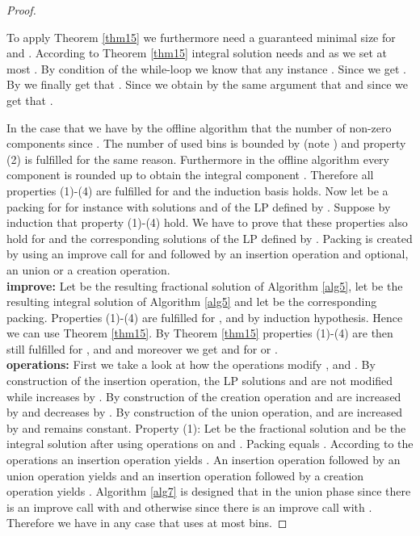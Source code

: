 \documentclass[a4paper,11pt]{article}
\begin{document}
\begin{proof}
\begin{enumerate}
	\end{enumerate}
	To apply Theorem \ref{thm15} we furthermore need a guaranteed minimal size for  and .
	According to Theorem \ref{thm15} integral solution  needs  and 
	 as we set at most .
	By condition of the while-loop we know that any instance . 
	Since  we get
	. 
	By  we
	finally get that . Since  we obtain by the same argument
	that  and since  we get that .
	
	In the case that  we have by the offline algorithm that the number of non-zero components  since . The number of used bins is bounded
	by 
	(note ) and property (2) is fulfilled for the same reason. Furthermore in the 
	offline algorithm every component  is rounded up to obtain the integral component . 
	Therefore all properties (1)-(4) are fulfilled for  and the induction basis holds.
	Now let  be a packing for  for instance  with solutions  and  of the LP defined by 
	. Suppose
	by induction that property (1)-(4) hold. We have to prove that these properties also hold for  and the
	corresponding solutions of the LP defined by . Packing  is created by using an
	improve call for  and  followed by an insertion operation and optional, an union or a creation operation.
	\\{\bf improve:} Let  be the resulting fractional solution of Algorithm \ref{alg5}, let  be the resulting integral solution
	of Algorithm \ref{alg5} and let  be the corresponding packing. Properties (1)-(4) are fulfilled 
	for ,  and  by induction hypothesis. Hence we can use Theorem \ref{thm15}. 
	By Theorem \ref{thm15} properties (1)-(4) are then still fulfilled for ,  and  and moreover we get
	 and 
	 for  or .
	\\{\bf operations:} First we take a look at how the operations modify ,  and .
	By construction of the insertion operation, the LP solutions  and  are not modified while 
	increases by . By construction of the creation operation  and  are increased by 
	and  decreases by . By construction of the union operation,  and  
	are increased by  and  remains constant.
	Property (1): Let  be the fractional solution and  be the integral solution after using operations 
	on  and . Packing  equals . According to the operations
	an insertion operation yields .
	An insertion operation followed by an union operation yields  and an insertion operation followed by a creation operation
	yields . Algorithm \ref{alg7} is designed that in 
	the union phase  since there is an improve call with 
	 and otherwise
	 since there is an improve call with .
	Therefore we have in any case that  uses at most  bins.

\end{proof}
\end{document}
